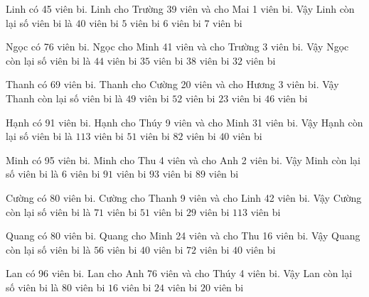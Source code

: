 \documentclass[12pt,a4paper]{article}
\begin{document}
\begin{ex}
Linh có 45 viên bi. Linh cho Trường 39 viên và cho Mai 1 viên bi. Vậy Linh còn lại số viên bi là
 \choice 
{$40$ viên bi}
{\True $5$ viên bi}
{$6$ viên bi}
{$7$ viên bi}
\end{ex}
\begin{ex}
Ngọc có 76 viên bi. Ngọc cho Minh 41 viên và cho Trường 3 viên bi. Vậy Ngọc còn lại số viên bi là
 \choice 
{$44$ viên bi}
{$35$ viên bi}
{$38$ viên bi}
{\True $32$ viên bi}
\end{ex}
\begin{ex}
Thanh có 69 viên bi. Thanh cho Cường 20 viên và cho Hương 3 viên bi. Vậy Thanh còn lại số viên bi là
 \choice 
{$49$ viên bi}
{$52$ viên bi}
{$23$ viên bi}
{\True $46$ viên bi}
\end{ex}
\begin{ex}
Hạnh có 91 viên bi. Hạnh cho Thúy 9 viên và cho Minh 31 viên bi. Vậy Hạnh còn lại số viên bi là
 \choice 
{$113$ viên bi}
{\True $51$ viên bi}
{$82$ viên bi}
{$40$ viên bi}
\end{ex}
\begin{ex}
Minh có 95 viên bi. Minh cho Thu 4 viên và cho Anh 2 viên bi. Vậy Minh còn lại số viên bi là
 \choice 
{$6$ viên bi}
{$91$ viên bi}
{$93$ viên bi}
{\True $89$ viên bi}
\end{ex}
\begin{ex}
Cường có 80 viên bi. Cường cho Thanh 9 viên và cho Linh 42 viên bi. Vậy Cường còn lại số viên bi là
 \choice 
{$71$ viên bi}
{$51$ viên bi}
{\True $29$ viên bi}
{$113$ viên bi}
\end{ex}
\begin{ex}
Quang có 80 viên bi. Quang cho Minh 24 viên và cho Thu 16 viên bi. Vậy Quang còn lại số viên bi là
 \choice 
{$56$ viên bi}
{\True $40$ viên bi}
{$72$ viên bi}
{\True $40$ viên bi}
\end{ex}
\begin{ex}
Lan có 96 viên bi. Lan cho Anh 76 viên và cho Thúy 4 viên bi. Vậy Lan còn lại số viên bi là
 \choice 
{$80$ viên bi}
{\True $16$ viên bi}
{$24$ viên bi}
{$20$ viên bi}
\end{ex}
\end{document}
